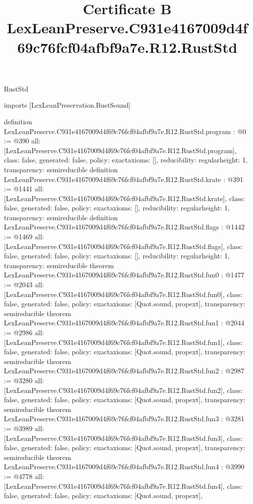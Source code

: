 \begin{lexlean}{RustStd}
\title{Certificate B LexLeanPreserve.C931e4167009d4f69c76fcf04afbf9a7e.R12.RustStd}
\begin{coremodule}
imports [LexLeanPreservation.RustSound]

definition LexLeanPreserve.C931e4167009d4f69c76fcf04afbf9a7e.R12.RustStd.program : @0 := @390 {
  all: [LexLeanPreserve.C931e4167009d4f69c76fcf04afbf9a7e.R12.RustStd.program],
  class: false,
  generated: false,
  policy: exact{axioms: []},
  reducibility: regular{height: 1},
  transparency: semireducible
}
definition LexLeanPreserve.C931e4167009d4f69c76fcf04afbf9a7e.R12.RustStd.krate : @391 := @1441 {
  all: [LexLeanPreserve.C931e4167009d4f69c76fcf04afbf9a7e.R12.RustStd.krate],
  class: false,
  generated: false,
  policy: exact{axioms: []},
  reducibility: regular{height: 1},
  transparency: semireducible
}
definition LexLeanPreserve.C931e4167009d4f69c76fcf04afbf9a7e.R12.RustStd.flags : @1442 := @1469 {
  all: [LexLeanPreserve.C931e4167009d4f69c76fcf04afbf9a7e.R12.RustStd.flags],
  class: false,
  generated: false,
  policy: exact{axioms: []},
  reducibility: regular{height: 1},
  transparency: semireducible
}
theorem LexLeanPreserve.C931e4167009d4f69c76fcf04afbf9a7e.R12.RustStd.fun0 : @1477 := @2043 {
  all: [LexLeanPreserve.C931e4167009d4f69c76fcf04afbf9a7e.R12.RustStd.fun0],
  class: false,
  generated: false,
  policy: exact{axioms: [Quot.sound, propext]},
  transparency: semireducible
}
theorem LexLeanPreserve.C931e4167009d4f69c76fcf04afbf9a7e.R12.RustStd.fun1 : @2044 := @2986 {
  all: [LexLeanPreserve.C931e4167009d4f69c76fcf04afbf9a7e.R12.RustStd.fun1],
  class: false,
  generated: false,
  policy: exact{axioms: [Quot.sound, propext]},
  transparency: semireducible
}
theorem LexLeanPreserve.C931e4167009d4f69c76fcf04afbf9a7e.R12.RustStd.fun2 : @2987 := @3280 {
  all: [LexLeanPreserve.C931e4167009d4f69c76fcf04afbf9a7e.R12.RustStd.fun2],
  class: false,
  generated: false,
  policy: exact{axioms: [Quot.sound, propext]},
  transparency: semireducible
}
theorem LexLeanPreserve.C931e4167009d4f69c76fcf04afbf9a7e.R12.RustStd.fun3 : @3281 := @3989 {
  all: [LexLeanPreserve.C931e4167009d4f69c76fcf04afbf9a7e.R12.RustStd.fun3],
  class: false,
  generated: false,
  policy: exact{axioms: [Quot.sound, propext]},
  transparency: semireducible
}
theorem LexLeanPreserve.C931e4167009d4f69c76fcf04afbf9a7e.R12.RustStd.fun4 : @3990 := @4778 {
  all: [LexLeanPreserve.C931e4167009d4f69c76fcf04afbf9a7e.R12.RustStd.fun4],
  class: false,
  generated: false,
  policy: exact{axioms: [Quot.sound, propext]},
}
\end{coremodule}
\end{lexlean}
